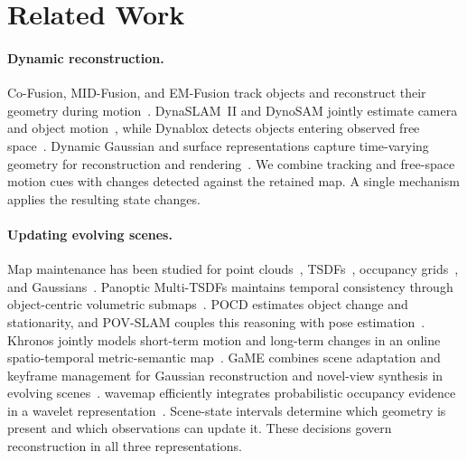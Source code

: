 \section{Related Work}
\label{sec:related_work}

\paragraph{Dynamic reconstruction.}
Co-Fusion, MID-Fusion, and EM-Fusion track objects and reconstruct their geometry during motion~\cite{runz2017cofusion,
xu2019midfusion,strecke2019emfusion}. DynaSLAM~II and DynoSAM jointly estimate camera and object
motion~\cite{bescos2021dynaslam2,morris2025dynosam}, while Dynablox detects objects entering observed free
space~\cite{schmid2023dynablox}. Dynamic Gaussian and surface representations capture time-varying geometry for
reconstruction and rendering~\cite{matsuki2025fourdtam,li2025fourdgsslam,li2026dynagslam}.
We combine tracking and free-space motion cues with changes detected against the retained map.
A single mechanism applies the resulting state changes.

\paragraph{Updating evolving scenes.}
Map maintenance has been studied for point clouds~\cite{pomerleau2014longterm,lazaro2018efficient,kim2022ltmapper},
TSDFs~\cite{fehr2017tsdfchange,schmid2022panoptic}, occupancy grids~\cite{hornung2013octomap,reijgwart2023wavemap},
and Gaussians~\cite{yugay2026game,cheng2025ltgaussian,zeng2025gaussianupdate,ackermann2025clsplats}.
Panoptic Multi-TSDFs maintains temporal consistency through object-centric volumetric
submaps~\cite{schmid2022panoptic}.
POCD estimates object change and stationarity, and POV-SLAM couples this reasoning with pose
estimation~\cite{qian2022pocd,qian2023povslam}. Khronos jointly models short-term motion and long-term changes
in an online spatio-temporal metric-semantic map~\cite{schmid2024khronos}.
GaME combines scene adaptation and keyframe management for Gaussian reconstruction and novel-view synthesis
in evolving scenes~\cite{yugay2026game}. wavemap efficiently integrates probabilistic occupancy evidence
in a wavelet representation~\cite{reijgwart2023wavemap}.
Scene-state intervals determine which geometry is present and which observations can update it.
These decisions govern reconstruction in all three representations.

